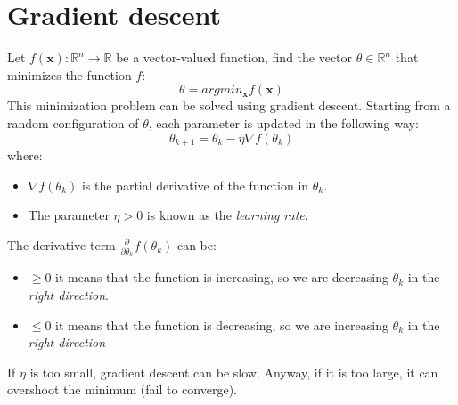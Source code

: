 \section{Gradient descent}
Let $f(\textbf{x}): \mathbb{R}^{n} \rightarrow \mathbb{R}$ be a vector-valued function, find the vector $\theta \in \mathbb{R}^{n}$ that minimizes the function $f$:
\[\theta = argmin_{\textbf{x}}f(\textbf{x})\]
This minimization problem can be solved using gradient descent. Starting from a random configuration of $\theta$, each parameter is updated in the following way:
\[\theta_{k+1} = \theta_{k} - \eta \nabla f(\theta_{k})\]
where: 
\begin{itemize}
    \item $\nabla f(\theta_{k})$ is the partial derivative of the function in $\theta_{k}$.
    \item The parameter $\eta > 0$ is known as the \textit{learning rate}. 
\end{itemize}
The derivative term $\frac{\partial}{\partial \theta_{k}}f(\theta_{k})$ can be:
\begin{itemize}
    \item $\geq 0$ it means that the function is increasing, so we are decreasing $\theta_{k}$ in the \textit{right direction}.
    \item $\leq 0$ it means that the function is decreasing, so we are increasing $\theta_{k}$ in the \textit{right direction}
\end{itemize}
If $\eta$ is too small, gradient descent can be slow. Anyway, if it is too large, it can overshoot the minimum (fail to converge).


